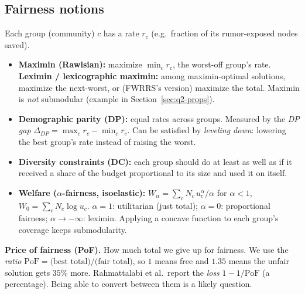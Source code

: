 \documentclass[11pt]{article}
\newcommand{\PoF}{\mathrm{PoF}}
\begin{document}
\subsection{Fairness notions}
Each group (community) $c$ has a rate $r_c$ (e.g.\ fraction of its rumor-exposed nodes saved).
\begin{itemize}
\item \textbf{Maximin (Rawlsian):} maximize $\min_c r_c$, the worst-off group's rate. \textbf{Leximin / lexicographic maximin:} among maximin-optimal solutions, maximize the next-worst, or (FWRRS's version) maximize the total. Maximin is \emph{not} submodular (example in Section~\ref{sec:q2-props}).
\item \textbf{Demographic parity (DP):} equal rates across groups. Measured by the \emph{DP gap} $\Delta_{DP}=\max_c r_c-\min_c r_c$. Can be satisfied by \emph{leveling down}: lowering the best group's rate instead of raising the worst.
\item \textbf{Diversity constraints (DC):} each group should do at least as well as if it received a share of the budget proportional to its size and used it on itself.
\item \textbf{Welfare ($\alpha$-fairness, isoelastic):} $W_\alpha=\sum_c N_c\,u_c^\alpha/\alpha$ for $\alpha<1$, $W_0=\sum_c N_c\log u_c$. $\alpha=1$: utilitarian (just total); $\alpha=0$: proportional fairness; $\alpha\to-\infty$: leximin. Applying a concave function to each group's coverage keeps submodularity.
\end{itemize}

\textbf{Price of fairness (PoF).} How much total we give up for fairness. We use the \emph{ratio} $\PoF=\text{(best total)}/\text{(fair total)}$, so $1$ means free and $1.35$ means the unfair solution gets $35\%$ more. Rahmattalabi et al.\ report the \emph{loss} $1-1/\PoF$ (a percentage). Being able to convert between them is a likely question.
\end{document}
